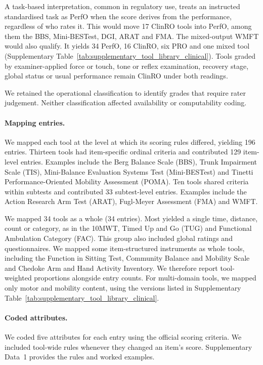 \documentclass[11pt]{article}
\begin{document}
A task-based interpretation, common in regulatory use, treats an instructed standardised task as PerfO when the score derives from the performance, regardless of who rates it. This would move 17 ClinRO tools into PerfO, among them the BBS, Mini-BESTest, DGI, ARAT and FMA. The mixed-output WMFT would also qualify. It yields 34 PerfO, 16 ClinRO, six PRO and one mixed tool (Supplementary Table~\ref{tab:supplementary_tool_library_clinical}). Tools graded by examiner-applied force or touch, tone or reflex examination, recovery stage, global status or usual performance remain ClinRO under both readings.

We retained the operational classification to identify grades that require rater judgement. Neither classification affected availability or computability coding.

\paragraph{Mapping entries.} We mapped each tool at the level at which its scoring rules differed, yielding 196 entries. Thirteen tools had item-specific ordinal criteria and contributed 129 item-level entries. Examples include the Berg Balance Scale (BBS), Trunk Impairment Scale (TIS), Mini-Balance Evaluation Systems Test (Mini-BESTest) and Tinetti Performance-Oriented Mobility Assessment (POMA). Ten tools shared criteria within subtests and contributed 33 subtest-level entries. Examples include the Action Research Arm Test (ARAT), Fugl-Meyer Assessment (FMA) and WMFT.

We mapped 34 tools as a whole (34 entries). Most yielded a single time, distance, count or category, as in the 10MWT, Timed Up and Go (TUG) and Functional Ambulation Category (FAC). This group also included global ratings and questionnaires. We mapped some item-structured instruments as whole tools, including the Function in Sitting Test, Community Balance and Mobility Scale and Chedoke Arm and Hand Activity Inventory. We therefore report tool-weighted proportions alongside entry counts. For multi-domain tools, we mapped only motor and mobility content, using the versions listed in Supplementary Table~\ref{tab:supplementary_tool_library_clinical}.

\paragraph{Coded attributes.} We coded five attributes for each entry using the official scoring criteria. We included tool-wide rules whenever they changed an item's score. Supplementary Data~1 provides the rules and worked examples.
\end{document}
